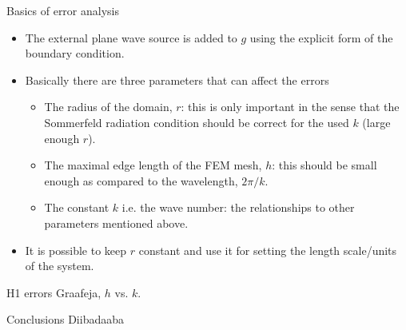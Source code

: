 \documentclass{beamer}
\begin{document}
\begin{frame}{Basics of error analysis}
 \begin{itemize}
  \item The external plane wave source is added to $g$ using the explicit form of the boundary condition.
  \item Basically there are three parameters that can affect the errors
  \begin{itemize}
  \item The radius of the domain, $r$: this is only important in the sense that the Sommerfeld radiation condition
  should be correct for the used $k$ (large enough $r$).
  \item The maximal edge length of the FEM mesh, $h$: this should be small enough as compared to the wavelength,
  $2\pi/k$.
  \item The constant $k$ i.e. the wave number: the relationships to other parameters mentioned above.
  \end{itemize}
  \item It is possible to keep $r$ constant and use it for setting the length scale/units of the system.
 \end{itemize}
\end{frame}

\begin{frame}{H1 errors}
 Graafeja, $h$ vs. $k$.
\end{frame}

\begin{frame}{Conclusions}
 Diibadaaba
\end{frame}
\end{document}
